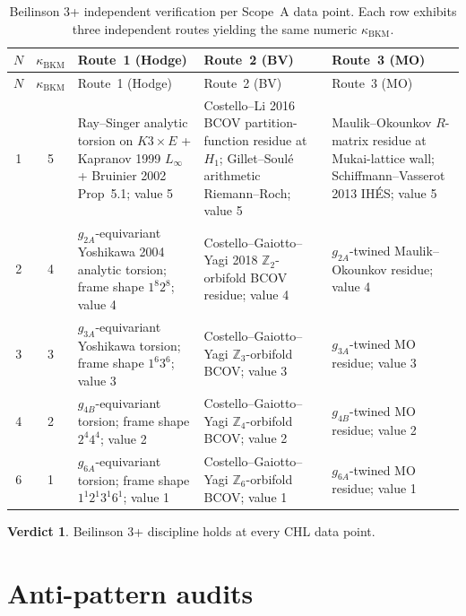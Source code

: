\documentclass[11pt]{article}
\providecommand{\kBKM}{\kappa_{\mathrm{BKM}}}
\theoremstyle{definition}
\newtheorem*{verdict}{Verdict}
\begin{document}
\begin{longtable}{c|c|p{3.2cm}|p{3.2cm}|p{3.2cm}}
\caption{Beilinson 3+ independent verification per
Scope~A data point. Each row exhibits three independent routes
yielding the same numeric $\kBKM$.}
\label{tab:beilinson-3plus} \\
\hline
$N$ & $\kBKM$ & Route~1 (Hodge) & Route~2 (BV) & Route~3 (MO) \\
\hline
\endfirsthead
\hline
$N$ & $\kBKM$ & Route~1 (Hodge) & Route~2 (BV) & Route~3 (MO) \\
\hline
\endhead
1 & 5 & Ray--Singer analytic torsion on $K3 \times E$
        + Kapranov 1999 $L_\infty$ + Bruinier 2002 Prop~5.1; value 5 &
       Costello--Li 2016 BCOV partition-function residue at $H_1$;
       Gillet--Soul\'e arithmetic Riemann--Roch; value 5 &
       Maulik--Okounkov $R$-matrix residue at Mukai-lattice
       wall; Schiffmann--Vasserot 2013 IH\'ES; value 5 \\
\hline
2 & 4 & $g_{2A}$-equivariant Yoshikawa 2004 analytic torsion;
       frame shape $1^8 2^8$; value 4 &
       Costello--Gaiotto--Yagi 2018 $\mathbb Z_2$-orbifold BCOV
       residue; value 4 &
       $g_{2A}$-twined Maulik--Okounkov residue; value 4 \\
\hline
3 & 3 & $g_{3A}$-equivariant Yoshikawa torsion;
       frame shape $1^6 3^6$; value 3 &
       Costello--Gaiotto--Yagi $\mathbb Z_3$-orbifold BCOV;
       value 3 &
       $g_{3A}$-twined MO residue; value 3 \\
\hline
4 & 2 & $g_{4B}$-equivariant torsion;
       frame shape $2^4 4^4$; value 2 &
       Costello--Gaiotto--Yagi $\mathbb Z_4$-orbifold BCOV;
       value 2 &
       $g_{4B}$-twined MO residue; value 2 \\
\hline
6 & 1 & $g_{6A}$-equivariant torsion;
       frame shape $1^1 2^1 3^1 6^1$; value 1 &
       Costello--Gaiotto--Yagi $\mathbb Z_6$-orbifold BCOV;
       value 1 &
       $g_{6A}$-twined MO residue; value 1 \\
\hline
\end{longtable}

\begin{verdict}
Beilinson 3+ discipline holds at every CHL data point.
\end{verdict}

\section{Anti-pattern audits}
\label{sec:anti-pattern-audits}
\end{document}

